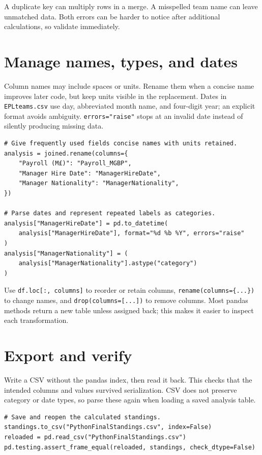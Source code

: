 \documentclass[11pt,letterpaper]{article}
\begin{document}
A duplicate key can multiply rows in a merge. A misspelled team name can leave unmatched data. Both errors can be harder to notice after additional calculations, so validate immediately.

\section{Manage names, types, and dates}
Column names may include spaces or units. Rename them when a concise name improves later code, but keep units visible in the replacement. Dates in \texttt{EPLteams.csv} use day, abbreviated month name, and four-digit year; an explicit format avoids ambiguity. \texttt{errors="raise"} stops at an invalid date instead of silently producing missing data.

\begin{lstlisting}
# Give frequently used fields concise names with units retained.
analysis = joined.rename(columns={
    "Payroll (M£)": "Payroll_MGBP",
    "Manager Hire Date": "ManagerHireDate",
    "Manager Nationality": "ManagerNationality",
})

# Parse dates and represent repeated labels as categories.
analysis["ManagerHireDate"] = pd.to_datetime(
    analysis["ManagerHireDate"], format="%d %b %Y", errors="raise"
)
analysis["ManagerNationality"] = (
    analysis["ManagerNationality"].astype("category")
)
\end{lstlisting}

Use \texttt{df.loc[:, columns]} to reorder or retain columns, \texttt{rename(columns=\{...\})} to change names, and \texttt{drop(columns=[...])} to remove columns. Most pandas methods return a new table unless assigned back; this makes it easier to inspect each transformation.

\section{Export and verify}
Write a CSV without the pandas index, then read it back. This checks that the intended columns and values survived serialization. CSV does not preserve category or date types, so parse these again when loading a saved analysis table.

\begin{lstlisting}
# Save and reopen the calculated standings.
standings.to_csv("PythonFinalStandings.csv", index=False)
reloaded = pd.read_csv("PythonFinalStandings.csv")
pd.testing.assert_frame_equal(reloaded, standings, check_dtype=False)
\end{lstlisting}
\end{document}
